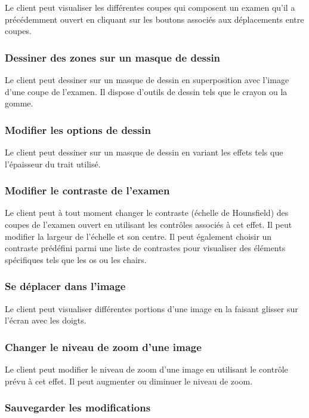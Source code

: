 Le client peut visualiser les différentes coupes qui composent un examen qu'il a précédemment ouvert
en cliquant sur les boutons associés aux déplacements entre coupes.

\subsubsection{Dessiner des zones sur un masque de dessin}

Le client peut dessiner sur un masque de dessin en superposition avec l'image d'une coupe de l'examen.
Il dispose d'outils de dessin tels que le crayon ou la gomme.

\subsubsection{Modifier les options de dessin}

Le client peut dessiner sur un masque de dessin en variant les effets tels que l'épaisseur du trait
utilisé.

\subsubsection{Modifier le contraste de l'examen}

Le client peut à tout moment changer le contraste (échelle de Hounsfield) des coupes de l'examen ouvert
en utilisant les contrôles associés à cet effet. Il peut modifier la largeur de l'échelle et son centre.
Il peut également choisir un contraste prédéfini parmi une liste de contrastes pour visualiser des éléments
spécifiques tels que les os ou les chairs.

\subsubsection{Se déplacer dans l'image}

Le client peut visualiser différentes portions d'une image en la faisant glisser sur l'écran avec les doigts.

\subsubsection{Changer le niveau de zoom d'une image}

Le client peut modifier le niveau de zoom d'une image en utilisant le contrôle prévu à cet effet.
Il peut augmenter ou diminuer le niveau de zoom.

\subsubsection{Sauvegarder les modifications}

